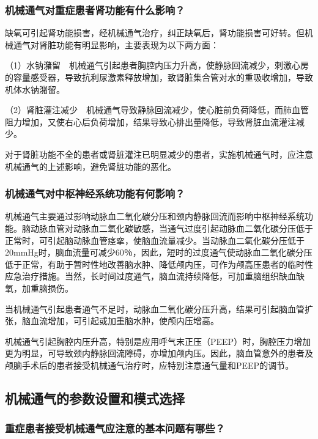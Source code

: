 \subsubsection{机械通气对重症患者肾功能有什么影响？}

缺氧可引起肾功能损害，经机械通气治疗，纠正缺氧后，肾功能损害可好转。但机械通气对肾脏功能有明显影响，主要表现为以下两方面：

（1）水钠潴留　机械通气引起患者胸腔内压力升高，使静脉回流减少，刺激心房的容量感受器，导致抗利尿激素释放增加，致肾脏集合管对水的重吸收增加，导致机体水钠潴留。

（2）肾脏灌注减少　机械通气导致静脉回流减少，使心脏前负荷降低，而肺血管阻力增加，又使右心后负荷增加，结果导致心排出量降低，导致肾脏血流灌注减少。

对于肾脏功能不全的患者或肾脏灌注已明显减少的患者，实施机械通气时，应注意机械通气的上述影响，避免肾脏功能的恶化。

\subsubsection{机械通气对中枢神经系统功能有何影响？}

机械通气主要通过影响动脉血二氧化碳分压和颈内静脉回流而影响中枢神经系统功能。脑动脉血管对动脉血二氧化碳敏感，当通气过度引起动脉血二氧化碳分压低于正常时，可引起脑动脉血管痉挛，使脑血流量减少。当动脉血二氧化碳分压低于20mmHg时，脑血流量可减少60％，因此，短时的过度通气使动脉血二氧化碳分压低于正常，有助于暂时性地改善脑水肿、降低颅内压，可作为颅高压患者的临时性应急治疗措施。当然，长时间过度通气，脑血流持续降低，可加重脑组织缺血缺氧，加重脑损伤。

当机械通气引起患者通气不足时，动脉血二氧化碳分压升高，结果可引起脑血管扩张，脑血流增加，可引起或加重脑水肿，使颅内压增高。

机械通气引起胸腔内压升高，特别是应用呼气末正压（PEEP）时，胸腔压力增加更为明显，可导致颈内静脉回流障碍，亦增加颅内压。因此，脑血管意外的患者及颅脑手术后的患者接受机械通气治疗时，应特别注意通气量和PEEP的调节。

\subsection{机械通气的参数设置和模式选择}

\subsubsection{重症患者接受机械通气应注意的基本问题有哪些？}

